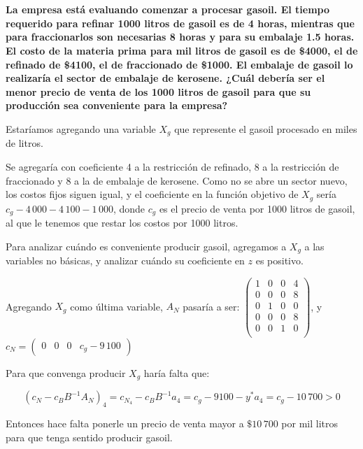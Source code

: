 \documentclass[10pt,a4paper]{article}
\begin{document}
\section{} %
\textbf{La empresa está evaluando comenzar a procesar gasoil. El tiempo requerido para refinar 1000 litros de gasoil es de 4 horas, mientras que para fraccionarlos son necesarias 8 horas y para su embalaje 1.5 horas. El costo de la materia prima para mil litros de gasoil es de \$4000, el de refinado de \$4100, el de fraccionado de \$1000. El embalaje de gasoil lo realizaría el sector de embalaje de kerosene. ¿Cuál debería ser el menor precio de venta de los 1000 litros de gasoil para que su producción sea conveniente para la empresa?}

\vspace{5mm}

Estaríamos agregando una variable $X_g$ que represente el gasoil procesado en miles de litros.

Se agregaría con coeficiente 4 a la restricción de refinado, 8 a la restricción de fraccionado y 8 a la de embalaje de kerosene. Como no se abre un sector nuevo, los costos fijos siguen igual, y el coeficiente en la función objetivo de $X_g$ sería $c_g - 4\,000 - 4\,100 - 1\,000$, donde $c_g$ es el precio de venta por 1000 litros de gasoil, al que le tenemos que restar los costos por 1000 litros.

Para analizar cuándo es conveniente producir gasoil, agregamos a $X_g$ a las variables no básicas, y analizar cuándo su coeficiente en $z$ es positivo.

Agregando $X_g$ como última variable, $A_N$ pasaría a ser: $\begin{pmatrix}
	1 & 0 & 0 & 4 \\
	0 & 0 & 0 & 8 \\
	0 & 1 & 0 & 0 \\
	0 & 0 & 0 & 8 \\
	0 & 0 & 1 & 0 \\
\end{pmatrix}$, y $c_N = \begin{pmatrix}
	0 & 0 & 0 & c_g - 9\,100
\end{pmatrix}$

Para que convenga producir $X_g$ haría falta que:

\[
	(c_N - c_B B^{-1} A_N)_4 = c_{N_4} - c_B B^{-1}a_4 = c_g - 9100 - y^* a_4 = c_g - 10\,700 > 0
\]

Entonces hace falta ponerle un precio de venta mayor a $\$10\,700$ por mil litros para que tenga sentido producir gasoil.
\end{document}
